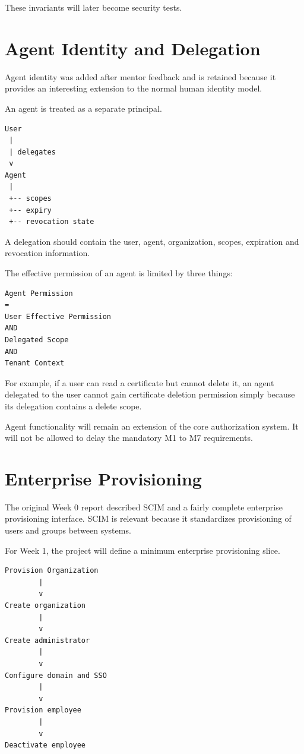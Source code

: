 \documentclass[11pt,a4paper]{article}
\begin{document}
These invariants will later become security tests.

\section{Agent Identity and Delegation}

Agent identity was added after mentor feedback and is retained because it provides an interesting extension to the normal human identity model.

An agent is treated as a separate principal.

\begin{verbatim}
User
 |
 | delegates
 v
Agent
 |
 +-- scopes
 +-- expiry
 +-- revocation state
\end{verbatim}

A delegation should contain the user, agent, organization, scopes, expiration and revocation information.

The effective permission of an agent is limited by three things:

\begin{verbatim}
Agent Permission
=
User Effective Permission
AND
Delegated Scope
AND
Tenant Context
\end{verbatim}

For example, if a user can read a certificate but cannot delete it, an agent delegated to the user cannot gain certificate deletion permission simply because its delegation contains a delete scope.

Agent functionality will remain an extension of the core authorization system. It will not be allowed to delay the mandatory M1 to M7 requirements.

\section{Enterprise Provisioning}

The original Week 0 report described SCIM and a fairly complete enterprise provisioning interface. SCIM is relevant because it standardizes provisioning of users and groups between systems.

For Week 1, the project will define a minimum enterprise provisioning slice.

\begin{verbatim}
Provision Organization
        |
        v
Create organization
        |
        v
Create administrator
        |
        v
Configure domain and SSO
        |
        v
Provision employee
        |
        v
Deactivate employee
\end{verbatim}
\end{document}
